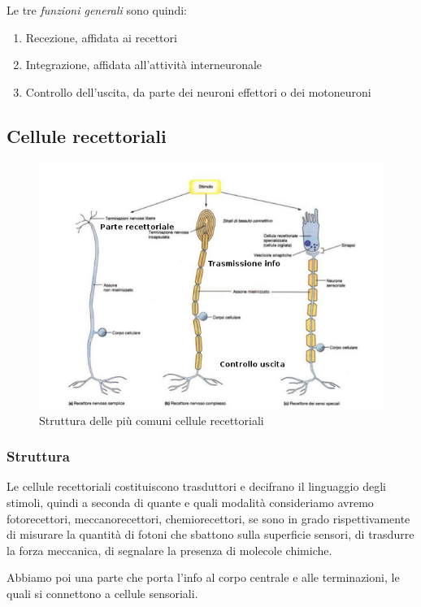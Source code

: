 \documentclass[a4paper,12pt]{article}
\begin{document}
Le tre \emph{funzioni generali} sono quindi:
\begin{enumerate}
\item{Recezione, affidata ai recettori}
\item{Integrazione, affidata all'attività interneuronale}
\item{Controllo dell'uscita, da parte dei neuroni effettori o dei motoneuroni}
\end{enumerate}

\subsection{Cellule recettoriali}

\begin{figure}[H]
\centering
\includegraphics[scale=0.5]{immagine/neuroni.jpg}
\caption{Struttura delle più comuni cellule recettoriali}
\label{img:ner}
\end{figure}

\subsubsection{Struttura}
Le cellule recettoriali costituiscono trasduttori e decifrano il linguaggio degli stimoli, quindi a seconda di quante e quali modalità consideriamo avremo fotorecettori, meccanorecettori, chemiorecettori, se sono in grado rispettivamente di misurare la quantità di fotoni che sbattono sulla superficie sensori, di trasdurre la forza meccanica, di segnalare la presenza di molecole chimiche. 

Abbiamo poi una parte che porta l'info al corpo centrale e alle terminazioni, le quali si connettono a cellule sensoriali.
\end{document}
